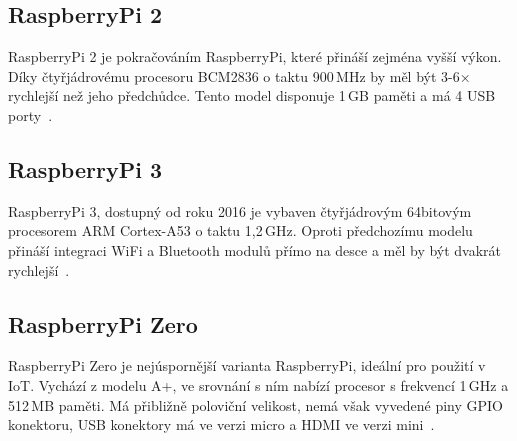 	\subsection{RaspberryPi 2}
	RaspberryPi 2 je pokračováním RaspberryPi, které přináší zejména vyšší výkon. Díky čtyřjádrovému procesoru BCM2836 o taktu 900\,MHz by měl být 3-6× rychlejší než jeho předchůdce. Tento model disponuje 1\,GB paměti a má 4 USB porty~\cite{RaspiTwo}.


\subsection{RaspberryPi 3}
		RaspberryPi 3, dostupný od roku 2016 je vybaven čtyřjádrovým 64bitovým procesorem ARM Cortex-A53 o taktu 1,2\,GHz. Oproti předchozímu modelu přináší integraci WiFi a Bluetooth modulů přímo na desce a měl by být dvakrát rychlejší~\cite{RaspiThree}.
		
\subsection{RaspberryPi Zero}
		RaspberryPi Zero je nejúspornější varianta RaspberryPi, ideální pro použití v IoT. Vychází z modelu A+, ve srovnání s ním nabízí procesor s frekvencí 1\,GHz a 512\,MB paměti. Má přibližně poloviční velikost, nemá však vyvedené piny GPIO konektoru, USB konektory má ve verzi micro a HDMI ve verzi mini~\cite{RaspiZero}.

